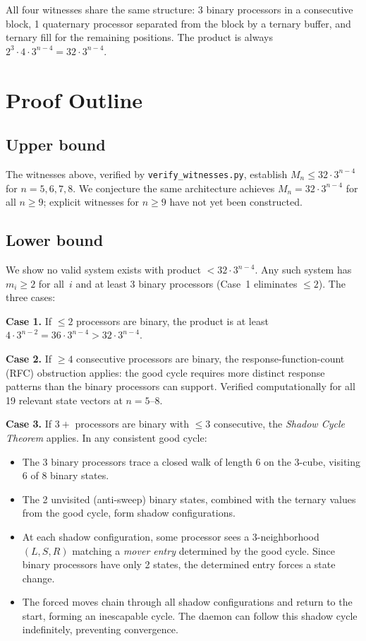 \documentclass[11pt]{article}
\begin{document}
All four witnesses share the same structure: 3 binary processors in a consecutive block, 1 quaternary processor separated from the block by a ternary buffer, and ternary fill for the remaining positions. The product is always $2^3 \cdot 4 \cdot 3^{n-4} = 32 \cdot 3^{n-4}$.

\section{Proof Outline}

\subsection*{Upper bound}

The witnesses above, verified by \texttt{verify\_witnesses.py}, establish $M_n \le 32 \cdot 3^{n-4}$ for $n = 5, 6, 7, 8$. We conjecture the same architecture achieves $M_n = 32 \cdot 3^{n-4}$ for all $n \ge 9$; explicit witnesses for $n \ge 9$ have not yet been constructed.

\subsection*{Lower bound}

We show no valid system exists with product $< 32 \cdot 3^{n-4}$. Any such system has $m_i \ge 2$ for all~$i$ and at least 3 binary processors (Case~1 eliminates $\le 2$). The three cases:

\medskip\noindent\textbf{Case 1.} If $\le 2$ processors are binary, the product is at least $4 \cdot 3^{n-2} = 36 \cdot 3^{n-4} > 32 \cdot 3^{n-4}$.

\medskip\noindent\textbf{Case 2.} If $\ge 4$ consecutive processors are binary, the response-function-count (RFC) obstruction applies: the good cycle requires more distinct response patterns than the binary processors can support. Verified computationally for all 19 relevant state vectors at $n = 5$--$8$.

\medskip\noindent\textbf{Case 3.} If $3+$ processors are binary with $\le 3$ consecutive, the \emph{Shadow Cycle Theorem} applies. In any consistent good cycle:
\begin{itemize}
\item The 3 binary processors trace a closed walk of length 6 on the 3-cube, visiting 6 of 8 binary states.
\item The 2 unvisited (anti-sweep) binary states, combined with the ternary values from the good cycle, form shadow configurations.
\item At each shadow configuration, some processor sees a 3-neighborhood $(L,S,R)$ matching a \emph{mover entry} determined by the good cycle. Since binary processors have only 2 states, the determined entry forces a state change.
\item The forced moves chain through all shadow configurations and return to the start, forming an inescapable cycle. The daemon can follow this shadow cycle indefinitely, preventing convergence.
\end{itemize}
\end{document}
